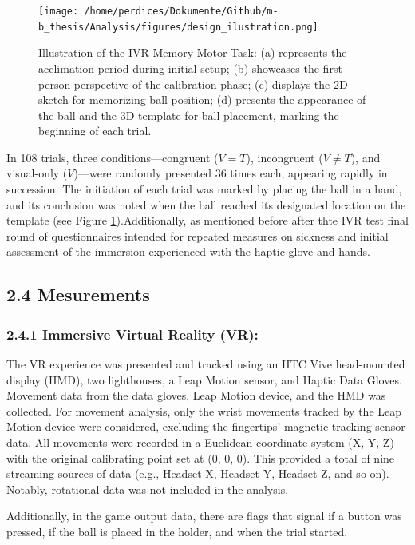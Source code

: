 \documentclass[12pt,oneside,openright]{report}
\begin{document}
    \begin{figure}[!ht]
        \centering
        \texttt{[image: /home/perdices/Dokumente/Github/m-b\_thesis/Analysis/figures/design\_ilustration.png]}
        \caption{Illustration of the IVR Memory-Motor Task: (a) represents the acclimation period during initial setup; (b) showcases the first-person perspective of the calibration phase; (c) displays the 2D sketch for memorizing ball position; (d) presents the appearance of the ball and the 3D template for ball placement, marking the beginning of each trial.}
        \label{fig:look}
        \end{figure}
 
In 108 trials, three conditions—congruent ($V=T$), incongruent ($V \neq T$), and visual-only ($V$)—were randomly presented 36 times each, appearing rapidly in succession. The initiation of each trial was marked by placing the ball in a hand, and its conclusion was noted when the ball reached its designated location on the template (see Figure \ref{fig:look}).Additionally, as mentioned before after thte IVR test final round of questionnaires intended for repeated measures on sickness and initial assessment of the immersion experienced with the haptic glove and hands.

\subsection*{2.4 Mesurements}
\subsubsection*{2.4.1 Immersive Virtual Reality (VR):}

The VR experience was presented and tracked using an HTC Vive head-mounted display (HMD), two lighthouses, a Leap Motion sensor, and Haptic Data Gloves. Movement data from the data gloves, Leap Motion device, and the HMD was collected. For movement analysis, only the wrist movements tracked by the Leap Motion device were considered, excluding the fingertips' magnetic tracking sensor data. All movements were recorded in a Euclidean coordinate system (X, Y, Z) with the original calibrating point set at (0, 0, 0). This provided a total of nine streaming sources of data (e.g., Headset X, Headset Y, Headset Z, and so on). Notably, rotational data was not included in the analysis.

Additionally, in the game output data, there are flags that signal if a button was pressed, if the ball is placed in the holder, and when the trial started.
\end{document}

